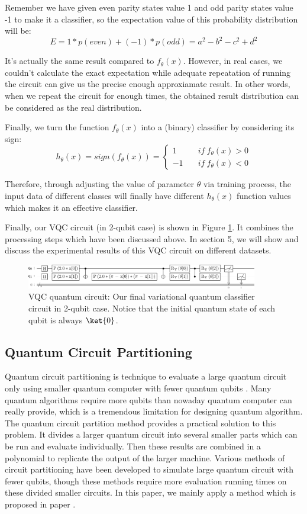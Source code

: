 \documentclass[sigconf]{acmart}
\begin{document}
Remember we have given even parity states value 1 and odd parity states value -1 to make it a classifier, so the expectation value of this probability distribution will be:
$$E=1*p(even)+(-1)*p(odd)=a^2-b^2-c^2+d^2$$

It's actually the same result compared to $f_{\theta}(x)$. However, in real cases, we couldn't calculate the exact expectation while adequate repeatation of running the circuit can give us the precise enough approxiamate result. In other words, when we repeat the circuit for enough times, the obtained result distribution can be considered as the real distribution.

Finally, we turn the function $f_{\theta}(x)$ into a (binary) classifier by considering its sign:
$$
h_{\theta}(x)=sign(f_{\theta}(x))=\left\{
\begin{aligned}
	1  & \quad if \ f_{\theta}(x)>0 \\
	-1  & \quad if \ f_{\theta}(x)<0 
\end{aligned}
\right.
$$

Therefore, through adjusting the value of parameter $\theta$ via training process, the input data of different classes will finally have different $h_{\theta}(x)$ function values which makes it an effective classifier.

Finally, our VQC circuit (in 2-qubit case) is shown in Figure \ref{fig:whole}. It combines the  processing steps which have been discussed above. In section 5, we will show and discuss the experimental results of this VQC circuit on different datasets.
\begin{figure}[!ht]
	\centering
	\includegraphics[width=0.9\textwidth]{whole.png}
	\caption{VQC quantum circuit: {\small \textnormal{Our final variational quantum classifier circuit in 2-qubit case. Notice that the initial quantum state of each qubit is always $\ket{0}$.}} }
	\label{fig:whole}
\end{figure}

\subsection{Quantum Circuit Partitioning}
Quantum circuit partitioning is technique to evaluate a large quantum circuit only using smaller quantum computer with fewer quantum qubits \cite{marshall2022high}. Many quantum algorithms require more qubits than nowaday quantum computer can really provide, which is a tremendous limitation for designing quantum algorithm. The quantum circuit partition method provides a practical solution to this problem. It divides a larger quantum circuit into several smaller parts which can be run and evaluate individually. Then these results are combined in a polynomial to replicate the output of the larger machine. Various methods of circuit partitioning have been developed to simulate large quantum circuit with fewer qubits, though these methods require more evaluation running times on these divided smaller circuits. In this paper, we mainly apply a method which is proposed in paper \cite{marshall2022high}.
\end{document}
